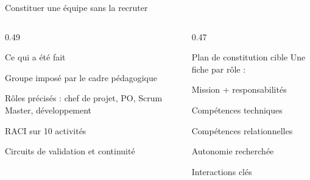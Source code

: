 \begin{frame}{Constituer une équipe sans la recruter}
\begin{columns}[T]
\begin{column}{0.49\linewidth}
\begin{block}{Ce qui a été fait}
\small
\begin{tightitems}
  \item Groupe imposé par le cadre pédagogique
  \item Rôles précisés : chef de projet, PO, Scrum Master, développement
  \item RACI sur 10 activités
  \item Circuits de validation et continuité
\end{tightitems}
\end{block}
\vspace{0.25em}
\small{}
\end{column}
\begin{column}{0.47\linewidth}
\begin{block}{Plan de constitution cible}
\small Une fiche par rôle :
\begin{tightitems}
  \item Mission + responsabilités
  \item Compétences techniques
  \item Compétences relationnelles
  \item Autonomie recherchée
  \item Interactions clés
\end{tightitems}
\end{block}
\vspace{0.25em}
\small{}
\end{column}
\end{columns}
\end{frame}

